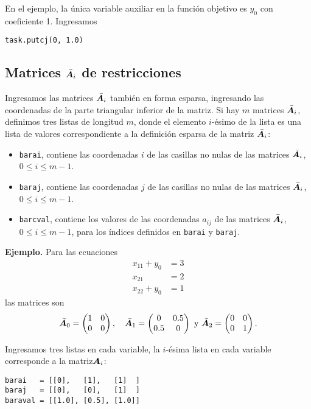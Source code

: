 \documentclass[11pt]{article}
\begin{document}
En el ejemplo, la única variable auxiliar en la función objetivo es $y_0$ con coeficiente 1. Ingresamos
\begin{lstlisting}
task.putcj(0, 1.0)
\end{lstlisting}

\subsection{Matrices $\bar {\bm{A}}_i$ de restricciones}

Ingresamos las matrices $\bar {\bm{A}}_i$ también en forma esparsa, ingresando las coordenadas de la parte triangular inferior de la matriz. Si hay $m$ matrices $\bar {\bm{A}}_i$, definimos tres listas de longitud $m$, donde el elemento $i$-ésimo de la lista es una lista de valores correspondiente a la definición esparsa de la matriz $\bar {\bm{A}}_i$:
\begin{itemize}
\item \texttt{barai}, contiene las coordenadas $i$ de las casillas no nulas de las matrices $\bar {\bm{A}}_i$, $0 \le i \le m-1$.
\item \texttt{baraj}, contiene las coordenadas $j$ de las casillas no nulas de las matrices $\bar {\bm{A}}_i$, $0 \le i \le m-1$.
\item \texttt{barcval}, contiene los valores de las coordenadas $a_{ij}$ de las matrices $\bar {\bm{A}}_i$, $0 \le i \le m-1$, para los índices definidos en \texttt{barai} y \texttt{baraj}.
\end{itemize}

\textbf{Ejemplo.} Para las ecuaciones
\begin{align*}
x_{11} + y_0 &= 3 \\
x_{21} &= 2 \\
x_{22} + y_0 &= 1
\end{align*}
las matrices son 
$$\bar {\bm{A}}_0 = \begin{pmatrix} 1 & 0 \\ 0 & 0 \end{pmatrix}, \quad \bar {\bm{A}}_1 = \begin{pmatrix} 0 & 0.5 \\ 0.5 & 0 \end{pmatrix} \text{ y } \bar {\bm{A}}_2 = \begin{pmatrix} 0 & 0 \\ 0 & 1 \end{pmatrix}.$$

Ingresamos tres listas en cada variable, la $i$-ésima lista en cada variable corresponde a la matriz$\bm{A}_i$:
\begin{lstlisting}
barai   = [[0],   [1],   [1]  ]
baraj   = [[0],   [0],   [1]  ]
baraval = [[1.0], [0.5], [1.0]]
\end{lstlisting}
\end{document}
